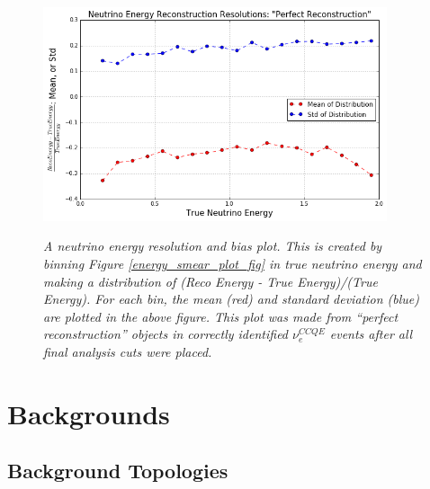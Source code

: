 \begin{figure}[ht!]
\centering
\includegraphics[width=0.9\textwidth]{Figures/LEE_EnergyRes_WithAnalysisCuts.png}\\%
\caption{\textit{A neutrino energy resolution and bias plot. This is created by binning Figure \ref{energy_smear_plot_fig} in true neutrino energy and making a distribution of (Reco Energy - True Energy)/(True Energy). For each bin, the mean (red) and standard deviation (blue) are plotted in the above figure. This plot was made from ``perfect reconstruction'' objects in correctly identified $\nu_e^{CCQE}$ events after all final analysis cuts were placed.}}
\label{energy_res_plot_fig}
\end{figure}

\section{Backgrounds}

\subsection{Background Topologies}\label{LEEbackgroundtopologiessection}

